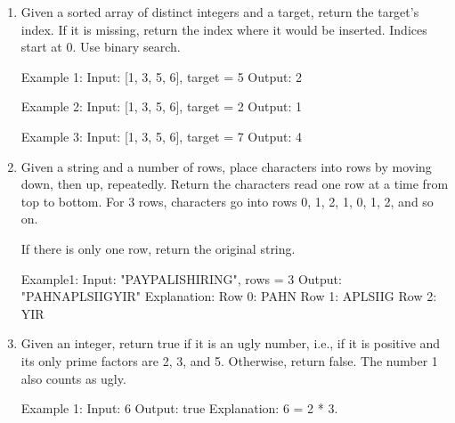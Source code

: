 \begin{enumerate}
\begin{consolethree}
Example 1:
Input: nums1 = [1, 2, 3, 0, 0, 0]
       nums2 = [2, 5, 6]
       n = 3
       m = 3		   
Output: nums1 = [1, 2, 2, 3, 5, 6]

The placeholder zeros are ignored. Keep duplicate values.
\end{consolethree}
\newpage



\item
Given a sorted array of distinct integers and a target, return the target's index. If it is missing, return the index where it would be inserted. Indices start at 0. Use binary search.

\begin{consolethree}
Example 1:
Input: [1, 3, 5, 6], target = 5
Output: 2

Example 2:
Input: [1, 3, 5, 6], target = 2
Output: 1

Example 3:
Input: [1, 3, 5, 6], target = 7
Output: 4
\end{consolethree}
\newpage



\item
Given a string and a number of rows, place characters into rows by moving down, then up, repeatedly. Return the characters read one row at a time from top to bottom.
For 3 rows, characters go into rows 0, 1, 2, 1, 0, 1, 2, and so on.

If there is only one row, return the original string.
\begin{consolethree}
Example1:
Input: "PAYPALISHIRING", rows = 3
Output: "PAHNAPLSIIGYIR"
Explanation:
Row 0: PAHN
Row 1: APLSIIG
Row 2: YIR
\end{consolethree}
\newpage



\item
Given an integer, return true if it is an ugly number, i.e., if it is positive and its only prime factors are 2, 3, and 5. Otherwise, return false. The number 1 also counts as ugly.

\begin{consolethree}
Example 1:
Input: 6
Output: true
Explanation: 6 = 2 * 3.


\end{consolethree}
\end{enumerate}
